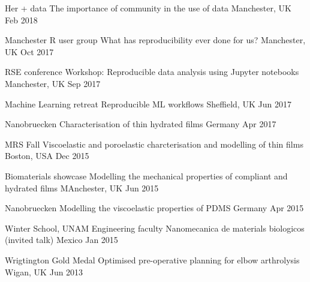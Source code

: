 


\begin{cvpresentations}

\cvpresentation
{Her + data} %
{The importance of community in the use of data} %
{Manchester, UK} %
{Feb 2018} %




\cvpresentation
{Manchester R user group} %
{What has reproducibility ever done for us?} %
{Manchester, UK} %
{Oct 2017} %



\cvpresentation
{RSE conference} %
{Workshop: Reproducible data analysis using Jupyter notebooks} %
{Manchester, UK} %
{Sep 2017} %




\cvpresentation
{Machine Learning retreat} %
{Reproducible ML workflows} %
{Sheffield, UK} %
{Jun 2017} %



\cvpresentation
{Nanobruecken }
{Characterisation of thin hydrated films}
{Germany}
{Apr 2017}


\cvpresentation
{MRS Fall }
{Viscoelastic and poroelastic charcterisation and modelling of thin films}
{Boston, USA}
{Dec 2015}


\cvpresentation
{Biomaterials showcase}
{Modelling the mechanical properties of compliant and hydrated films}
{MAnchester, UK}
{Jun 2015}


\cvpresentation
{Nanobruecken }
{Modelling the viscoelastic properties of PDMS}
{Germany}
{Apr 2015}


\cvpresentation
{Winter School, UNAM Engineering faculty}
{Nanomecanica de materials biologicos (invited talk)}
{Mexico}
{Jan 2015}


\cvpresentation
{Wrigtington Gold Medal}
{Optimised pre-operative planning for elbow arthrolysis}
{Wigan, UK}
{Jun 2013}

\end{cvpresentations}
